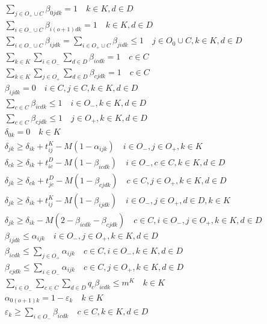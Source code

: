\documentclass[10pt]{article}
\begin{document}
\begin{align}
& \sum_{j \in O_{+} \cup C} \beta_{0jdk} = 1 \quad k \in K, d \in D \\
& \sum_{i \in O_{-} \cup C} \beta_{i(o+1)dk} = 1 \quad k \in K, d \in D \\
& \sum_{i \in O_{-} \cup C} \beta_{ijdk} = \sum_{i \in O_{+} \cup C} \beta_{jidk} \le 1 \quad j \in O_{0} \cup C, k \in K, d \in D \\
& \sum_{k \in K} \sum_{i \in O_{-}} \sum_{d \in D} \beta_{icdk} = 1 \quad c \in C \\
& \sum_{k \in K} \sum_{j \in O_{+}} \sum_{d \in D} \beta_{cjdk} = 1 \quad c \in C \\
& \beta_{ijdk} = 0 \quad i \in C, j \in C, k \in K, d \in D \\
& \sum_{c \in C} \beta_{icdk} \le 1 \quad i \in O_{-}, k \in K, d \in D \\
& \sum_{c \in C} \beta_{c j d k} \leq 1 \quad j \in O_{+}, k \in K, d \in D \\
& \delta_{0 k}=0 \quad k \in K \\
& \delta_{j k} \geq \delta_{i k}+t_{i j}^{K}-M(1-\alpha_{i j k}) \quad i \in O_{-}, j \in O_{+}, k \in K \\
& \delta_{c k} \geq \delta_{i k}+t_{i c}^{D}-M(1-\beta_{i c d k}) \quad i \in O_{-}, c \in C, k \in K, d \in D \\
& \delta_{j k} \geq \delta_{c k}+t_{j c}^{D}-M(1-\beta_{c j d k}) \quad c \in C, j \in O_{+}, k \in K, d \in D \\
& \delta_{j k} \geq \delta_{i k}+t_{i j}^{K}-M(1-\beta_{i j d k}) \quad i \in O_{-}, j \in O_{+}, d \in D, k \in K \\
& \delta_{j k} \geq \delta_{i k}-M(2-\beta_{i c d k}-\beta_{c j d k}) \quad c \in C, i \in O_{-}, j \in O_{+}, k \in K, d \in D \\
& \beta_{i j d k} \leq \alpha_{i j k} \quad i \in O_{-}, j \in O_{+}, k \in K, d \in D \\
& \beta_{i c d k} \leq \sum_{j \in O_{+}} \alpha_{i j k} \quad c \in C, i \in O_{-}, k \in K, d \in D \\
& \beta_{c j d k} \leq \sum_{i \in O_{-}} \alpha_{i j k} \quad c \in C, j \in O_{+}, k \in K, d \in D \\
& \sum_{i \in O_{-}} \sum_{c \in C} \sum_{d \in D} q_{c} \beta_{i c d k} \leq m^{K} \quad k \in K \\
& \alpha_{0(o+1) k}=1-\varepsilon_{k} \quad k \in K \\
& \varepsilon_{k} \geq \sum_{i \in O_{-}} \beta_{i c d k} \quad c \in C, k \in K, d \in D \\

\end{align}
\end{document}
